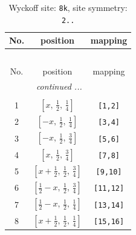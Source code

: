 \documentclass[fleqn,8pt]{jsarticle}
\begin{document}
\begin{longtable}{ccc}
\caption{Wyckoff site: {\tt 8k}, site symmetry: {\tt 2..}}
 \\
 \hline \hline
No. & position & mapping \\ \hline \endfirsthead

\multicolumn{2}{l}{\tablename\ \thetable{}} \\
 \hline \hline
No. & position & mapping \\ \hline \endhead

 \hline \hline
\multicolumn{2}{r}{\footnotesize\it continued ...} \\ \endfoot

 \hline \hline
\multicolumn{2}{r}{} \\ \endlastfoot

1 & $\left[ x,\, \frac{1}{2},\, \frac{1}{4} \right]$ & {\tt [1,2]} \\ \hline
2 & $\left[ - x,\, \frac{1}{2},\, \frac{1}{4} \right]$ & {\tt [3,4]} \\ \hline
3 & $\left[ - x,\, \frac{1}{2},\, \frac{3}{4} \right]$ & {\tt [5,6]} \\ \hline
4 & $\left[ x,\, \frac{1}{2},\, \frac{3}{4} \right]$ & {\tt [7,8]} \\ \hline
5 & $\left[ x + \frac{1}{2},\, \frac{1}{2},\, \frac{3}{4} \right]$ & {\tt [9,10]} \\ \hline
6 & $\left[ \frac{1}{2} - x,\, \frac{1}{2},\, \frac{3}{4} \right]$ & {\tt [11,12]} \\ \hline
7 & $\left[ \frac{1}{2} - x,\, \frac{1}{2},\, \frac{1}{4} \right]$ & {\tt [13,14]} \\ \hline
8 & $\left[ x + \frac{1}{2},\, \frac{1}{2},\, \frac{1}{4} \right]$ & {\tt [15,16]} \\
\end{longtable}
\renewcommand{\arraystretch}{1.2}
\end{document}
